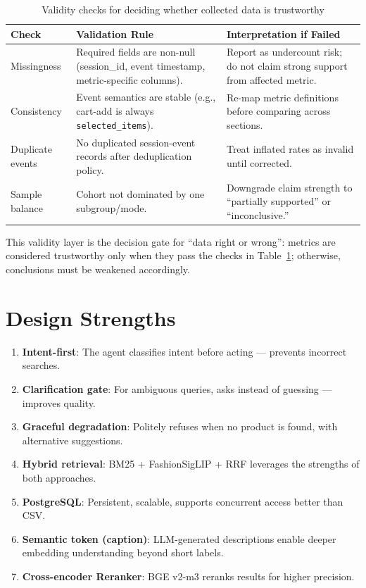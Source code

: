\begin{table}[H]
\centering
\begin{tabular}{p{4.0cm}p{4.7cm}p{5.0cm}}
\toprule
\textbf{Check} & \textbf{Validation Rule} & \textbf{Interpretation if Failed}\\
\midrule
Missingness & Required fields are non-null (session\_id, event timestamp, metric-specific columns). & Report as undercount risk; do not claim strong support from affected metric.\\
Consistency & Event semantics are stable (e.g., cart-add is always \texttt{selected\_items}). & Re-map metric definitions before comparing across sections.\\
Duplicate events & No duplicated session-event records after deduplication policy. & Treat inflated rates as invalid until corrected.\\
Sample balance & Cohort not dominated by one subgroup/mode. & Downgrade claim strength to ``partially supported'' or ``inconclusive.''\\
\bottomrule
\end{tabular}
\caption{Validity checks for deciding whether collected data is trustworthy}
\label{tab:data_validity_checks}
\end{table}

This validity layer is the decision gate for ``data right or wrong'': metrics are considered trustworthy only when they pass the checks in Table~\ref{tab:data_validity_checks}; otherwise, conclusions must be weakened accordingly.

\section{Design Strengths}
\begin{enumerate}
    \item \textbf{Intent-first}: The agent classifies intent before acting --- prevents incorrect searches.
    \item \textbf{Clarification gate}: For ambiguous queries, asks instead of guessing --- improves quality.
    \item \textbf{Graceful degradation}: Politely refuses when no product is found, with alternative suggestions.
    \item \textbf{Hybrid retrieval}: BM25 + FashionSigLIP + RRF leverages the strengths of both approaches.
    \item \textbf{PostgreSQL}: Persistent, scalable, supports concurrent access better than CSV.
    \item \textbf{Semantic token (caption)}: LLM-generated descriptions enable deeper embedding understanding beyond short labels.
    \item \textbf{Cross-encoder Reranker}: BGE v2-m3 reranks results for higher precision.
\end{enumerate}

